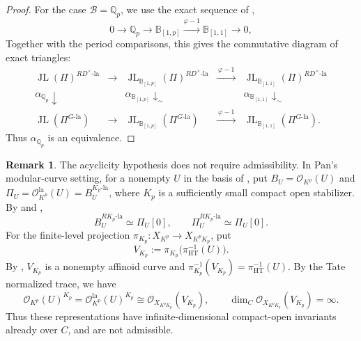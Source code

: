 \documentclass[11pt]{article}
\theoremstyle{definition}
\newtheorem{remark}[theorem]{Remark}
\newcommand{\Qp}{\mathbb Q_p}
\newcommand{\la}{\mathrm{la}}
\newcommand{\JL}{\operatorname{JL}}
\begin{document}
\begin{proof}
For the case $\mathscr{B}=\mathbb{Q}_p$, we use the exact sequence of
\cite[proof of Theorem~7.2.1, Step~1]{DRC},
\[
 0\longrightarrow\Qp\longrightarrow\mathbb B_{[1,p]}
 \xrightarrow{\varphi-1}\mathbb B_{[1,1]}\longrightarrow0,
\]
Together with the period comparisons, this gives the commutative
diagram of exact triangles:
\[
 \begin{array}{ccccc}
 \JL(\Pi)^{RD^\times\text{-}\la}
 &\longrightarrow&
 \JL_{\mathbb B_{[1,p]}}(\Pi)^{RD^\times\text{-}\la}
 &\xrightarrow{\ \varphi-1\ }&
 \JL_{\mathbb B_{[1,1]}}(\Pi)^{RD^\times\text{-}\la}\\[3pt]
 {\scriptstyle\alpha_{\Qp}}\downarrow&&
 {\scriptstyle\alpha_{\mathbb B_{[1,p]}}}\downarrow_{\sim}&&
 {\scriptstyle\alpha_{\mathbb B_{[1,1]}}}\downarrow_{\sim}\\[3pt]
 \JL(\Pi^{G\text{-}\la})
 &\longrightarrow&
 \JL_{\mathbb B_{[1,p]}}(\Pi^{G\text{-}\la})
 &\xrightarrow{\ \varphi-1\ }&
 \JL_{\mathbb B_{[1,1]}}(\Pi^{G\text{-}\la}).
 \end{array}
\]
Thus \(\alpha_{\Qp}\) is an equivalence.
\end{proof}

\begin{remark}%
\label{rem:Pan-local-analytic-acyclicity}
The acyclicity hypothesis does not require admissibility.
In Pan's modular-curve setting, for a nonempty \(U\) in the basis of
\cite[Theorem~4.1.7]{PanI}, put
\(B_U=\mathcal O_{K^p}(U)\) and
\(\Pi_U=\mathcal O^{\la}_{K^p}(U)=B_U^{K_p\text{-}\la}\),
where \(K_p\) is a sufficiently small compact open stabilizer.
By \cite[Proposition~4.3.15]{PanI} and
\cite[Remark~1.2.1(1) and Proposition~3.3.5]{RJRCSolid},
\[
 B_U^{RK_p\text{-}\la}\simeq \Pi_U[0],\qquad
 \Pi_U^{RK_p\text{-}\la}\simeq \Pi_U[0].
\]
For the finite-level projection
\(\pi_{K_p}:X_{K^p}\to X_{K^pK_p}\), put
\[
 V_{K_p}:=\pi_{K_p}\bigl(\pi_{\mathrm{HT}}^{-1}(U)\bigr).
\]
By \cite[\S4.3.2]{PanI}, \(V_{K_p}\) is a nonempty affinoid curve
and \(\pi_{K_p}^{-1}(V_{K_p})=\pi_{\mathrm{HT}}^{-1}(U)\).
By the Tate normalized trace, we have
\[
 \mathcal O_{K^p}(U)^{K_p}
 =\mathcal O^{\la}_{K^p}(U)^{K_p}
 \cong\mathcal O_{X_{K^pK_p}}(V_{K_p}),\qquad
 \dim_C\mathcal O_{X_{K^pK_p}}(V_{K_p})=\infty.
\]
Thus these representations have infinite-dimensional compact-open
invariants already over \(C\), and are not admissible.
\end{remark}
\end{document}

